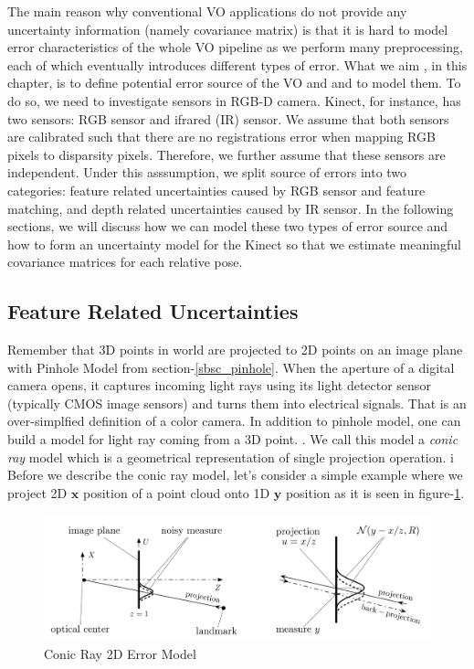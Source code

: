 \documentclass[a4paper]{report}
\numberwithin{figure}{section}
\begin{document}
The main reason why conventional VO applications do not provide any uncertainty 
information (namely covariance matrix) is that it is hard to model 
error characteristics of the whole VO pipeline as we perform many preprocessing, 
each of which eventually introduces different types of error. What we aim 
, in this chapter, is to define potential error source of the VO and 
and to model them. To do so, we need to investigate sensors in RGB-D camera. 
Kinect, for instance, has two sensors: RGB sensor 
and ifrared (IR) sensor. We assume that both sensors are calibrated such that 
there are no registrations error when mapping RGB pixels to disparsity pixels. 
Therefore, 
we further assume that these sensors are independent. Under this asssumption, 
we split source of errors into two categories: feature related uncertainties 
caused by RGB sensor and feature matching, and depth related uncertainties caused by 
IR sensor. In the following sections, we will discuss how we can model these 
two types of error source and how to form an uncertainty model 
for the Kinect so that we estimate meaningful covariance matrices for each 
relative pose.

\subsection{Feature Related Uncertainties} \label{sb_sc_pixel_uncertainty}

Remember that 3D points in world are projected to 2D points on an image plane with 
Pinhole Model from section-\ref{sbsc_pinhole}. When the aperture of a digital 
camera opens, it captures incoming light rays using its light detector sensor 
(typically CMOS image sensors) and turns them into electrical signals. That 
is an over-simplfied definition of a color camera. In addition to pinhole 
model, one can build a model for light ray coming from a 3D point.
. We call this model 
a \textit{conic ray} model which is a geometrical representation of 
single projection operation. i
Before we describe the conic ray model, let's consider a simple example where we 
project 2D $\mathbf{x}$ position of a point cloud onto 1D $\mathbf{y}$ position
as it is seen in figure-\ref{fig:conic_ray_2d_error_model}.


\begin{figure}[H]
	\centering
  \includegraphics[width=0.7\linewidth,natwidth=640,natheight=640]
  {fig/ref_imgs/conic_ray_2d_model.png}
  \caption{Conic Ray 2D Error Model}
	\label{fig:conic_ray_2d_error_model}
\end{figure}
\end{document}
